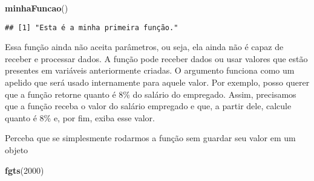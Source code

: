\documentclass[
]{book}
\newenvironment{Shaded}{\begin{snugshade}}{\end{snugshade}}
\newcommand{\CommentTok}[1]{\textcolor[rgb]{0.56,0.35,0.01}{\textit{#1}}}
\newcommand{\ControlFlowTok}[1]{\textcolor[rgb]{0.13,0.29,0.53}{\textbf{#1}}}
\newcommand{\DecValTok}[1]{\textcolor[rgb]{0.00,0.00,0.81}{#1}}
\newcommand{\FloatTok}[1]{\textcolor[rgb]{0.00,0.00,0.81}{#1}}
\newcommand{\KeywordTok}[1]{\textcolor[rgb]{0.13,0.29,0.53}{\textbf{#1}}}
\newcommand{\NormalTok}[1]{#1}
\newcommand{\OperatorTok}[1]{\textcolor[rgb]{0.81,0.36,0.00}{\textbf{#1}}}
\newcommand{\StringTok}[1]{\textcolor[rgb]{0.31,0.60,0.02}{#1}}
\begin{document}
\begin{Shaded}
\begin{Highlighting}[]
\KeywordTok{minhaFuncao}\NormalTok{()}
\end{Highlighting}
\end{Shaded}

\begin{verbatim}
## [1] "Esta é a minha primeira função."
\end{verbatim}

Essa função ainda não aceita parâmetros, ou seja, ela ainda não é capaz de receber e processar dados. A função pode receber dados ou usar valores que estão presentes em variáveis anteriormente criadas. O argumento funciona como um apelido que será usado internamente para aquele valor. Por exemplo, posso querer que a função retorne quanto é 8\% do salário do empregado. Assim, precisamos que a função receba o valor do salário empregado e que, a partir dele, calcule quanto é 8\% e, por fim, exiba esse valor.

\begin{Shaded}
\end{Shaded}

Perceba que se simplesmente rodarmos a função sem guardar seu valor em um objeto

\begin{Shaded}
\begin{Highlighting}[]
\KeywordTok{fgts}\NormalTok{(}\DecValTok{2000}\NormalTok{)}
\end{Highlighting}
\end{Shaded}
\end{document}
